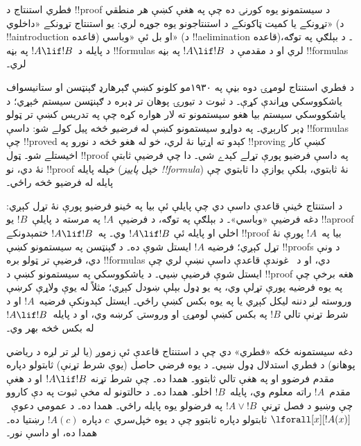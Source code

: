 \documentclass[../../../include/open-logic-section]{subfiles}
\begin{document}


فطري استنتاج د !!{proof} د سيستمونو يوه کورنۍ ده چې په هغې کښې هر
منطقي تړونکے يا کميت ټاکونکے د استنتاجونو يوه جوړه لري: يو استنتاج
تړونکے «داخلوي» (د !!a{introduction} قاعده) او بل ئې «وباسي»
(د !!a{elimination} قاعده)۔ د بېلګې په توګه، د \Intro{\lif}
پايله د~$!A \lif !B$ په بڼه !!{formula}s لري او د \Elim{\lif}
مقدمې د~$!A \lif !B$ په بڼه !!{formula}s لري۔

د فطري استنتاج لومړۍ دوه بڼې په ۱۹۳۰مو کلونو کښې ګېرهارډ
ګېنټسن او ستانيسواف ياشکووسکي وړاندې کړې۔ د ثبوت د تيورۍ پوهان
تر ډېره د ګېنټسن سيستم څېړي؛ د ياشکووسکي سيستم بيا هغو سيستمونو
ته لار هواره کړه چې په تدريس کښې تر ټولو ډېر کارېږي۔ په دواړو
سيستمونو کښې له \emph{فرضيو} څخه پيل کولے شو: داسې !!{formula}s
چې !!{prove}d کېدو ته اړتيا نۀ لري، خو له هغو څخه د نورو
 په !!{proving} کښې کار اخيستلے شو۔ ټول !!{proof} په
داسې فرضيو پورې تړلے کېدے شي۔ دا چې فرضيې ثابتې نۀ دي، نو
!!{proof} خپله پايله (خپل \emph{پاييز !!{formula}}) نۀ ثابتوي،
بلکې يوازې دا ثابتوي چې پايله له فرضيو څخه راځي۔

د استنتاج ځينې قاعدې داسې دي چې پايلې ئې بيا په ځينو فرضيو
پورې نۀ تړل کېږي: دغه فرضيې «وباسي»۔ د بېلګې په توګه،
\Intro{\lif} د فرضيې~$!A$ په مرسته د پايلې~$!B$ يو
!!a{proof} اخلي او پايله ئې $!A \lif !B$ وي۔ په~$!A \lif !B$ ختمېدونکے
!!{proof} بيا په~$!A$ پورې نۀ تړل کېږي؛ فرضيه $!A$ ايستل
شوې ده۔ د ګېنټسن په سيستمونو کښې !!{proof}s د
 ونې دي، فرضيې تر ټولو بره !!{formula}s
دي، او د~\Intro{\lif} غوندې قاعدې داسې نښې لري چې ايستل شوې
فرضيې ښيي۔ د ياشکووسکي په سيستمونو کښې د !!{proof} هغه برخې
چې په يوه فرضيه پورې تړلې وي، په يو ډول بېلې ښودل کېږي؛ مثلاً
له يوې ولاړې کرښې وروسته لږ دننه ليکل کېږي يا په يوه بکس کښې
راځي۔ ايستل کېدونکې فرضيه~$!A$ او د شرط تړنې تالي $!B$
په بکس کښې لومړۍ او وروستۍ کرښه وي، او د \Intro{\lif}
پايله~$!A \lif !B$ له بکس څخه بهر وي۔

دغه سيستمونه ځکه «فطري» دي چې د استنتاج قاعدې ئې زموږ
(يا لږ تر لږه د رياضي پوهانو) د فطري استدلال ډول ښيي۔ د يوه
فرضي حاصل (يوې شرط تړنې) ثابتولو دپاره مقدم فرضوو او په هغې
تالي ثابتوو۔ همدا \Intro{\lif} ده۔ چې شرط تړنه $!A \lif !B$ او
د هغې مقدم~$!A$ راته معلوم وي، پايله~$!B$ اخلو۔ همدا
\Elim{\lif} ده۔ د حالتونو له مخې ثبوت په دې کاروو چې وښيو
د فصل تړنې~$!A \lor !B$ په فرضولو يوه پايله راځي۔ همدا \Elim{\lor}
ده۔ د عمومي دعوې~$\lforall[x][!A(x)]$ ثابتولو دپاره ثابتوو چې د يوه
خپل‌سري~$c$ دپاره $!A(c)$ رښتيا ده۔ همدا \Intro{\lforall}
ده، او داسې نور۔
\end{document}
